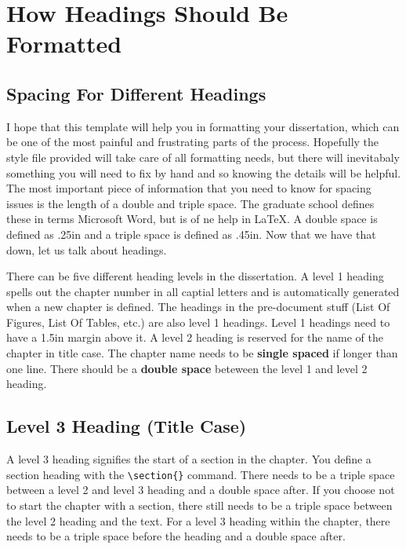 \chapter{How Headings Should Be Formatted}

\section{Spacing For Different Headings}

I hope that this template will help you in formatting your dissertation, which can be one of the most painful and frustrating parts of the process. Hopefully the style file provided will take care of all formatting needs, but there will inevitabaly something you will need to fix by hand and so knowing the details will be helpful. The most important piece of information that you need to know for spacing issues is the length of a double and triple space. The graduate school defines these in terms Microsoft Word, but is of ne help in \LaTeX. A double space is defined as .25in and a triple space is defined as .45in. Now that we have that down, let us talk about headings. 

There can be five different heading levels in the dissertation. A level 1 heading spells out the chapter number in all captial letters and is automatically generated when a new chapter is defined. The headings in the pre-document stuff (List Of Figures, List Of Tables, etc.) are also level 1 headings. Level 1 headings need to have a 1.5in margin above it. A level 2 heading is reserved for the name of the chapter in title case. The chapter name needs to be \textbf{single spaced} if longer than one line. There should be a \textbf{double space} beteween the level 1 and level 2 heading. 

\section{Level 3 Heading (Title Case)}
A level 3 heading signifies the start of a section in the chapter. You define a section heading with the \verb|\section{}| command. There needs to be a triple space between a level 2 and level 3 heading and a double space after. If you choose not to start the chapter with a section, there still needs to be a triple space between the level 2 heading and the text. For a level 3 heading within the chapter, there needs to be a triple space before the heading and a double space after.

